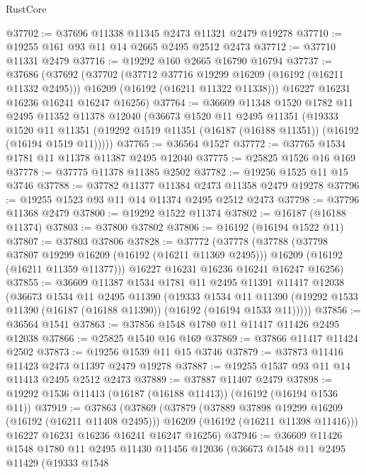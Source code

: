 \begin{lexlean}{RustCore}
\begin{coremodule}
@37702 := @37696 @11338 @11345 @2473 @11321 @2479 @19278
@37710 := @19255 @161 @93 @11 @14 @2665 @2495 @2512 @2473
@37712 := @37710 @11331 @2479
@37716 := @19292 @160 @2665 @16790 @16794
@37737 := @37686
    (@37692
      (@37702
        (@37712 @37716 @19299 @16209 (@16192 (@16211 @11332 @2495)))
        @16209
        (@16192 (@16211 @11322 @11338)))
      @16227
      @16231
      @16236
      @16241
      @16247
      @16256)
@37764 := @36609
    @11348
    @1520
    @1782
    @11
    @2495
    @11352
    @11378
    @12040
    (@36673
      @1520
      @11
      @2495
      @11351
      (@19333
        @1520
        @11
        @11351
        (@19292 @1519 @11351 (@16187 (@16188 @11351)) (@16192 (@16194 @1519 @11)))))
@37765 := @36564 @1527
@37772 := @37765 @1534 @1781 @11 @11378 @11387 @2495 @12040
@37775 := @25825 @1526 @16 @169
@37778 := @37775 @11378 @11385 @2502
@37782 := @19256 @1525 @11 @15 @3746
@37788 := @37782 @11377 @11384 @2473 @11358 @2479 @19278
@37796 := @19255 @1523 @93 @11 @14 @11374 @2495 @2512 @2473
@37798 := @37796 @11368 @2479
@37800 := @19292 @1522 @11374
@37802 := @16187 (@16188 @11374)
@37803 := @37800 @37802
@37806 := @16192 (@16194 @1522 @11)
@37807 := @37803 @37806
@37828 := @37772
    (@37778
      (@37788
        (@37798 @37807 @19299 @16209 (@16192 (@16211 @11369 @2495)))
        @16209
        (@16192 (@16211 @11359 @11377)))
      @16227
      @16231
      @16236
      @16241
      @16247
      @16256)
@37855 := @36609
    @11387
    @1534
    @1781
    @11
    @2495
    @11391
    @11417
    @12038
    (@36673
      @1534
      @11
      @2495
      @11390
      (@19333
        @1534
        @11
        @11390
        (@19292 @1533 @11390 (@16187 (@16188 @11390)) (@16192 (@16194 @1533 @11)))))
@37856 := @36564 @1541
@37863 := @37856 @1548 @1780 @11 @11417 @11426 @2495 @12038
@37866 := @25825 @1540 @16 @169
@37869 := @37866 @11417 @11424 @2502
@37873 := @19256 @1539 @11 @15 @3746
@37879 := @37873 @11416 @11423 @2473 @11397 @2479 @19278
@37887 := @19255 @1537 @93 @11 @14 @11413 @2495 @2512 @2473
@37889 := @37887 @11407 @2479
@37898 := @19292 @1536 @11413 (@16187 (@16188 @11413)) (@16192 (@16194 @1536 @11))
@37919 := @37863
    (@37869
      (@37879
        (@37889 @37898 @19299 @16209 (@16192 (@16211 @11408 @2495)))
        @16209
        (@16192 (@16211 @11398 @11416)))
      @16227
      @16231
      @16236
      @16241
      @16247
      @16256)
@37946 := @36609
    @11426
    @1548
    @1780
    @11
    @2495
    @11430
    @11456
    @12036
    (@36673
      @1548
      @11
      @2495
      @11429
      (@19333
        @1548

\end{coremodule}
\end{lexlean}

